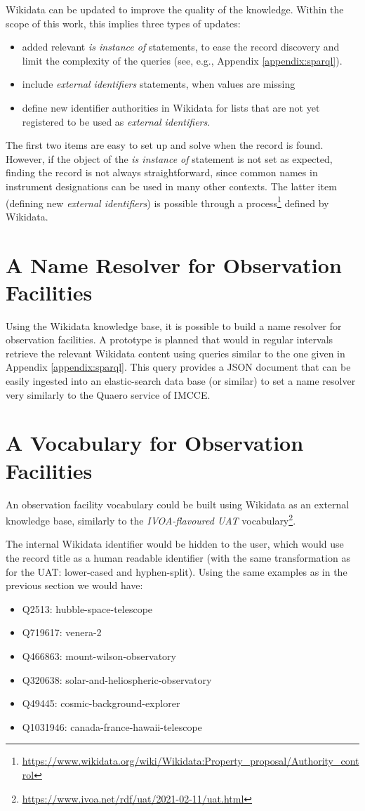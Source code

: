 \documentclass[11pt,a4paper]{ivoa}
\begin{document}
Wikidata can be updated to improve the quality of the knowledge.
Within the scope of this work, this implies three types of updates:
\begin{itemize}
\item added relevant \emph{is instance of} statements, to ease the 
record discovery and limit the complexity of the queries (see, e.g., 
Appendix \ref{appendix:sparql}). 
\item include \emph{external identifiers} statements, when values 
are missing
\item define new identifier authorities in Wikidata for lists that 
are not yet registered to be used as \emph{external identifiers}. 
\end{itemize}
The first two items are easy to set up and solve when the record is 
found. However, if the object of the \emph{is instance of} statement is 
not set as expected, finding the record is not always 
straightforward, since common names in instrument designations 
can be used in many other contexts. 
The latter item (defining new \emph{external identifiers}) is 
possible through a process\footnote{\url{https://www.wikidata.org/wiki/Wikidata:Property_proposal/Authority_control}}
defined by Wikidata. 

\section{A Name Resolver for Observation Facilities}
Using the Wikidata knowledge base, it is possible to build a name
resolver for observation facilities. A prototype is planned that would
in regular intervals retrieve the relevant 
Wikidata content using queries similar to the one
given in Appendix \ref{appendix:sparql}. This query provides
a JSON document that can be easily ingested into an elastic-search
data base (or similar) to set a name resolver very similarly to 
the Quaero service of IMCCE. 

\section{A Vocabulary for Observation Facilities}
An observation facility vocabulary could be built using Wikidata
as an external knowledge base, similarly to the \emph{IVOA-flavoured 
UAT} vocabulary\footnote{\url{https://www.ivoa.net/rdf/uat/2021-02-11/uat.html}}.

The internal Wikidata identifier would be hidden to the user, which 
would use the record title as a human readable identifier (with the 
same transformation as for the UAT: lower-cased and hyphen-split). 
Using the same examples as in the previous section we would have: 
\begin{itemize}
\item Q2513: hubble-space-telescope
\item Q719617: venera-2
\item Q466863: mount-wilson-observatory
\item Q320638: solar-and-heliospheric-observatory
\item Q49445: cosmic-background-explorer
\item Q1031946: canada-france-hawaii-telescope
\end{itemize}
\end{document}
